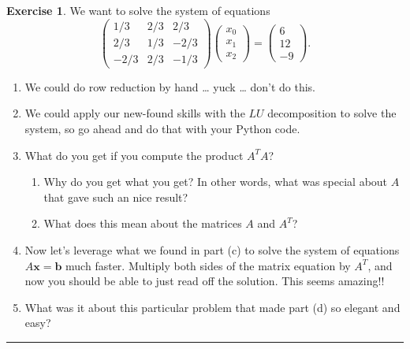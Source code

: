 \documentclass[
]{book}
\providecommand{\tightlist}{%
  \setlength{\itemsep}{0pt}\setlength{\parskip}{0pt}}
\theoremstyle{definition}
\theoremstyle{definition}
\theoremstyle{definition}
\newtheorem{exercise}{Exercise}[chapter]
\theoremstyle{remark}
\begin{document}
\begin{exercise}
\protect\hypertarget{exr:unnamed-chunk-339}{}{\label{exr:unnamed-chunk-339} }We want to solve the system of equations
\[ \begin{pmatrix} 1/3 & 2/3 & 2/3 \\ 2/3 & 1/3 & -2/3 \\ -2/3 & 2/3 & -1/3 \end{pmatrix} \begin{pmatrix} x_0 \\ x_1 \\ x_2 \end{pmatrix} = \begin{pmatrix} 6 \\ 12\\ -9 \end{pmatrix}. \]

\begin{enumerate}
\def\labelenumi{\alph{enumi}.}
\tightlist
\item
  We could do row reduction by hand \ldots{} yuck \ldots{} don't do this.
\item
  We could apply our new-found skills with the \(LU\) decomposition to solve the system, so go ahead and do that with your Python code.
\item
  What do you get if you compute the product \(A^T A\)?

  \begin{enumerate}
  \def\labelenumii{\roman{enumii}.}
  \tightlist
  \item
    Why do you get what you get? In other words, what was special about \(A\) that gave such an nice result?
  \item
    What does this mean about the matrices \(A\) and \(A^T\)?
  \end{enumerate}
\item
  Now let's leverage what we found in part (c) to solve the system of equations \(A \boldsymbol{x} = \boldsymbol{b}\) much faster. Multiply both sides of the matrix equation by \(A^T\), and now you should be able to just read off the solution. This seems amazing!!
\item
  What was it about this particular problem that made part (d) so elegant and easy?
\end{enumerate}
\end{exercise}

\begin{center}\rule{0.5\linewidth}{0.5pt}\end{center}
\end{document}
